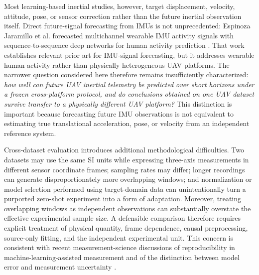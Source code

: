 \documentclass[preprint,12pt]{elsarticle}
\begin{document}
Most learning-based inertial studies, however, target displacement, velocity, attitude, pose, or sensor correction rather than the future inertial observation itself. Direct future-signal forecasting from IMUs is not unprecedented: Espinoza Jaramillo et al. forecasted multichannel wearable IMU activity signals with sequence-to-sequence deep networks for human activity prediction \cite{EspinozaJaramillo2023IMUForecast}. That work establishes relevant prior art for IMU-signal forecasting, but it addresses wearable human activity rather than physically heterogeneous UAV platforms. The narrower question considered here therefore remains insufficiently characterized: \emph{how well can future UAV inertial telemetry be predicted over short horizons under a frozen cross-platform protocol, and do conclusions obtained on one UAV dataset survive transfer to a physically different UAV platform?} This distinction is important because forecasting future IMU observations is not equivalent to estimating true translational acceleration, pose, or velocity from an independent reference system.

Cross-dataset evaluation introduces additional methodological difficulties. Two datasets may use the same SI units while expressing three-axis measurements in different sensor coordinate frames; sampling rates may differ; longer recordings can generate disproportionately more overlapping windows; and normalization or model selection performed using target-domain data can unintentionally turn a purported zero-shot experiment into a form of adaptation. Moreover, treating overlapping windows as independent observations can substantially overstate the effective experimental sample size. A defensible comparison therefore requires explicit treatment of physical quantity, frame dependence, causal preprocessing, source-only fitting, and the independent experimental unit. This concern is consistent with recent measurement-science discussions of reproducibility in machine-learning-assisted measurement and of the distinction between model error and measurement uncertainty \cite{Benoit2025Reproducibility,Huber2025ModelError}.
\end{document}
